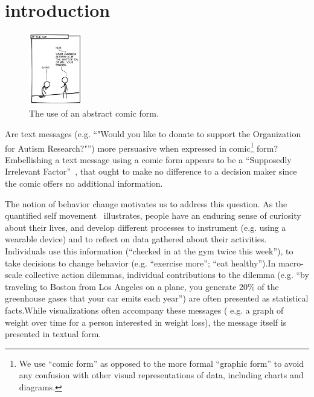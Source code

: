 



\section{introduction}
\label{sec:introduction}

\begin{figure}
    \centering
    \includegraphics[width=0.21\textwidth]{figures/intro_new.png}
  \vspace{-10pt}
  \caption{The use of an abstract comic form.} \label{fig:intro}
  \vspace{-10pt}
\end{figure}

Are text messages (e.g. ``"Would you like to donate to support the Organization for Autism Research?"'') more persuasive when expressed in comic\footnote{We use ``comic form'' as opposed to the more formal ``graphic form'' to avoid any confusion with other visual representations of data, including charts and diagrams.} form? Embellishing a text message using a comic form appears to be a ``Supposedly Irrelevant Factor''~\cite{Thaler2015}, that ought to make no difference to a decision maker since the comic offers no additional information.

The notion of behavior change motivates us to address this question. As the quantified self movement~\cite{Epstein2014,Choe2014} illustrates, people have an enduring sense of curiosity about their lives, and develop different processes to instrument (e.g. using a wearable device) and to reflect on data gathered about their activities. Individuals use this information (``checked in at the gym twice this week''), to take decisions to change behavior (e.g. ``exercise more''; ``eat healthy'').In macro-scale collective action dilemmas, individual contributions to the dilemma (e.g. ``by traveling to Boston from Los Angeles on a plane, you generate 20\% of the greenhouse gases that your car emits each year'') are often presented as statistical facts.While visualizations often accompany these messages ( e.g. a graph of weight over time for a person interested in weight loss), the message itself is presented in textual form.

